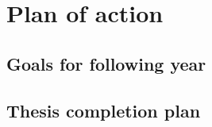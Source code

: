 \section{Plan of action}
  \subsection{Goals for following year}
  \subsection{Thesis completion plan}
